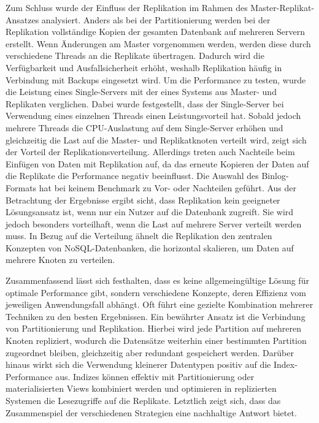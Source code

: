 Zum Schluss wurde der Einfluss der Replikation im Rahmen des Master-Replikat-Ansatzes analysiert.
Anders als bei der Partitionierung werden bei der Replikation vollständige Kopien der gesamten Datenbank auf mehreren Servern erstellt.
Wenn Änderungen am Master vorgenommen werden, werden diese durch verschiedene Threads an die Replikate übertragen.
Dadurch wird die Verfügbarkeit und Ausfallsicherheit erhöht, weshalb Replikation häufig in Verbindung mit Backups eingesetzt wird.
Um die Performance zu testen, wurde die Leistung eines Single-Servers mit der eines Systems aus Master- und Replikaten verglichen.
Dabei wurde festgestellt, dass der Single-Server bei Verwendung eines einzelnen Threads einen Leistungsvorteil hat.
Sobald jedoch mehrere Threads die CPU-Auslastung auf dem Single-Server erhöhen und gleichzeitig die Last auf die Master- und Replikatknoten verteilt wird, zeigt sich der Vorteil der Replikationsverteilung.
Allerdings treten auch Nachteile beim Einfügen von Daten mit Replikation auf, da das erneute Kopieren der Daten auf die Replikate die Performance negativ beeinflusst.
Die Auswahl des Binlog-Formats hat bei keinem Benchmark zu Vor- oder Nachteilen geführt.
Aus der Betrachtung der Ergebnisse ergibt sicht, dass Replikation kein geeigneter Lösungsansatz ist, wenn nur ein Nutzer auf die Datenbank zugreift.
Sie wird jedoch besonders vorteilhaft, wenn die Last auf mehrere Server verteilt werden muss.
In Bezug auf die Verteilung ähnelt die Replikation den zentralen Konzepten von NoSQL-Datenbanken, die horizontal skalieren, um Daten auf mehrere Knoten zu verteilen.

Zusammenfassend lässt sich festhalten, dass es keine allgemeingültige Lösung für optimale Performance gibt, sondern verschiedene Konzepte, deren Effizienz vom jeweiligen Anwendungsfall abhängt.
Oft führt eine gezielte Kombination mehrerer Techniken zu den besten Ergebnissen.
Ein bewährter Ansatz ist die Verbindung von Partitionierung und Replikation.
Hierbei wird jede Partition auf mehreren Knoten repliziert, wodurch die Datensätze weiterhin einer bestimmten Partition zugeordnet bleiben, gleichzeitig aber redundant gespeichert werden.
Darüber hinaus wirkt sich die Verwendung kleinerer Datentypen positiv auf die Index-Performance aus.
Indizes können effektiv mit Partitionierung oder materialisierten Views kombiniert werden und optimieren in replizierten Systemen die Lesezugriffe auf die Replikate.
Letztlich zeigt sich, dass das Zusammenspiel der verschiedenen Strategien eine nachhaltige Antwort bietet.